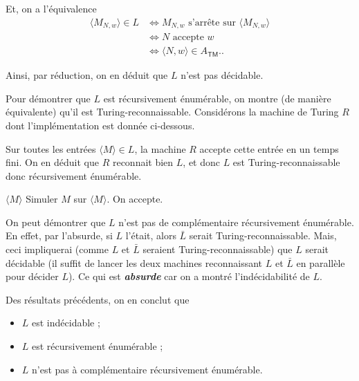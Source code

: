 \documentclass{../../notes}
\let\Entree\Require
\begin{document}
  Et, on a l'équivalence 
  \begin{align*}
    \langle M_{N,w} \rangle \in L &\iff M_{N,w} \text{ s'arrête sur } \langle M_{N,w} \rangle\\
    &\iff N \text{ accepte } w\\
    &\iff \langle N, w \rangle \in A_\mathsf{TM}.
  .\end{align*}

  Ainsi, par réduction, on en déduit que $L$ n'est pas décidable.

  Pour démontrer que $L$ est récursivement énumérable, on montre (de manière équivalente) qu'il est Turing-reconnaissable.
  Considérons la machine de Turing $R$ dont l'implémentation est donnée ci-dessous.

  \begin{multicols}{2}
    Sur toutes les entrées $\langle M\rangle \in L$, la machine $R$ accepte cette entrée en un temps fini.
    On en déduit que $R$ reconnait bien $L$, et donc $L$ est Turing-reconnaissable donc récursivement énumérable.

    \begin{mdframed}[linecolor=deepblue,innertopmargin=1em,frametitle={\color{white}Machine $R$},frametitlerule=true,frametitlealignment=\centering,frametitlebackgroundcolor=deepblue]
      \begin{algorithmic}
        \Entree $\langle M \rangle$
        \State Simuler $M$ sur $\langle M \rangle$.
        \State On accepte.
        \EndIf
      \end{algorithmic}
    \end{mdframed}
  \end{multicols}
  
  On peut démontrer que $L$ n'est pas de complémentaire récursivement énumérable.
  En effet, par l'absurde, si $L$ l'était, alors $\bar{L}$ serait Turing-reconnaissable.
  Mais, ceci impliquerai (comme $L$ et $\bar{L}$ seraient Turing-reconnaissable) que $L$ serait décidable (il suffit de lancer les deux machines reconnaissant $L$ et $\bar{L}$ en parallèle pour décider $L$).
  Ce qui est \textit{\textbf{absurde}} car on a montré l'indécidabilité de $L$.

  Des résultats précédents, on en conclut que 
  \begin{itemize}
    \item $L$ est indécidable ;
    \item $L$ est récursivement énumérable ;
    \item $L$ n'est pas à complémentaire récursivement énumérable.
  \end{itemize}
\end{document}
